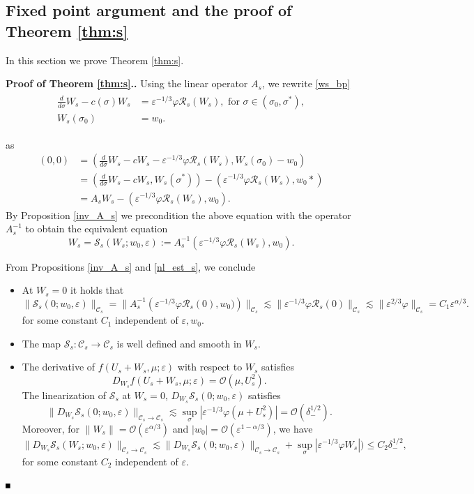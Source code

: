 \documentclass[letterpaper,11pt]{article}
\newcommand{\rmO}{\mathcal{O}}
\newcommand{\eps}{\varepsilon}
\newcommand{\lar}{ \lesssim }
\newcommand{\Ral}{\mathcal{R}}
\numberwithin{equation}{section}
\theoremstyle{plain}
\newenvironment{Proof}[1][\unskip]%
 {\begin{trivlist} \item[]{\bf Proof #1. }}%
 {\hspace*{\fill}$\rule{.4\baselineskip}{.4\baselineskip}$\end{trivlist}}
\begin{document}
\subsection{Fixed point argument and the proof of Theorem \ref{thm:s}}
In this section we prove Theorem \ref{thm:s}.
\begin{Proof}[ of Theorem \ref{thm:s}.]
Using the linear operator $A_s$, we rewrite \eqref{ws_bp}
\begin{align*}
\begin{split}
\frac{d}{d\sigma} W_s - c(\sigma)W_s &= \eps^{-1/3}\varphi \Ral_s(W_s), \text{ for }\sigma \in (\sigma_0,\sigma^*),\\
W_s(\sigma_0) &= w_0.
\end{split}
\end{align*}

as \begin{align*}
(0,0) &=\left( \frac{d}{d\sigma}W_s-c W_s - \eps^{-1/3}\varphi \Ral_s(W_s), W_s(\sigma_0)-w_0 \right)\\
&=\left( \frac{d}{d\sigma}W_s-cW_s, W_s(\sigma^*) \right)- \left(\eps^{-1/3}\varphi \Ral_s(W_s), w_0* \right)\\
&= A_s W_s - \left(\eps^{-1/3}\varphi \Ral_s(W_s), w_0 \right).
\end{align*} 
By Proposition \ref{inv_A_s} we precondition the above equation with the operator $A_s^{-1}$ to obtain the equivalent equation
\begin{equation}\label{fix_pt:s}
 W_s = \mathcal{S}_s(W_s; w_0,\eps):= A_s^{-1}(\eps^{-1/3}\varphi \mathcal{R}_s(W_s), w_0).
\end{equation}

From Propositions \ref{inv_A_s} and \ref{nl_est_s}, we conclude 
\begin{itemize}
\item At $W_s =0 $ it holds that  
\[
\|\mathcal{S}_s(0; w_0,\eps) \|_{\mathcal{C}_s}= \|A_s^{-1}\left(\eps^{-1/3}\varphi \mathcal{R}_s(0),w_0)\right)\|_{\mathcal{C}_s}  \lar \|\eps^{-1/3}\varphi \Ral_s(0)\|_{\mathcal{C}_s} \lar \|\eps^{2/3}\varphi  \|_{\mathcal{C}_s}=C_1\eps^{\alpha/3}.
\]
for some constant $C_1$ independent of $\eps,w_0$.

\item The map $\mathcal{S}_s: \mathcal{C}_s \to \mathcal{C}_s$ is well defined and smooth in $W_s$.

\item The derivative of $f(U_s+W_s,\mu;\eps)$ with respect to $W_s$ satisfies \[
D_{W_s} f(U_s+W_s,\mu;\eps)=\rmO(\mu, U_s^2).
\] 
The linearization of $\mathcal{S}_s$ at $W_s=0$, $D_{W_s} \mathcal{S}_s(0;w_0,\eps)$ satisfies
\[
\|D_{W_s} \mathcal{S}_{s}(0;w_0,\eps)\|_{\mathcal{C}_s \to\mathcal{C}_s} \lar \sup_{\sigma}|\eps^{-1/3}\varphi(\mu+U_s^2)| = \rmO(\delta_-^{1/2}).
\]
Moreover, for $\|W_{s}\| = \rmO(\eps^{\alpha/3})$ and $|w_0| =\rmO(\eps^{1-\alpha/3})$, we have \[
\|D_{W_s}\mathcal{S}_s(W_s;w_0,\eps)\|_{\mathcal{C}_s  \to \mathcal{C}_s} \lar  \|D_{W_s}\mathcal{S}_s(0;w_0,\eps)\|_{\mathcal{C}_s \to \mathcal{C}_s}+\sup_{\sigma}|\eps^{-1/3}\varphi W_s|) \le C_2\delta_-^{1/2},
\]
for some constant $C_2$ independent of $\eps$.
\end{itemize}


\end{Proof}
\end{document}
